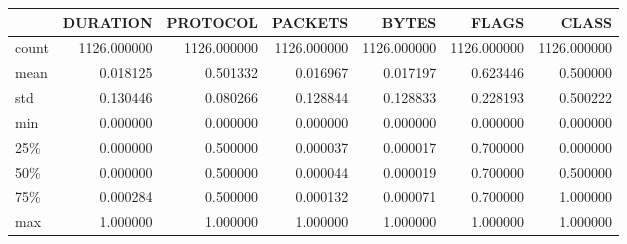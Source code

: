 \begin{tabular}{lrrrrrr}
\toprule
{} &     DURATION &     PROTOCOL &      PACKETS &        BYTES &        FLAGS &        CLASS \\
\midrule
count &  1126.000000 &  1126.000000 &  1126.000000 &  1126.000000 &  1126.000000 &  1126.000000 \\
mean  &     0.018125 &     0.501332 &     0.016967 &     0.017197 &     0.623446 &     0.500000 \\
std   &     0.130446 &     0.080266 &     0.128844 &     0.128833 &     0.228193 &     0.500222 \\
min   &     0.000000 &     0.000000 &     0.000000 &     0.000000 &     0.000000 &     0.000000 \\
25\%   &     0.000000 &     0.500000 &     0.000037 &     0.000017 &     0.700000 &     0.000000 \\
50\%   &     0.000000 &     0.500000 &     0.000044 &     0.000019 &     0.700000 &     0.500000 \\
75\%   &     0.000284 &     0.500000 &     0.000132 &     0.000071 &     0.700000 &     1.000000 \\
max   &     1.000000 &     1.000000 &     1.000000 &     1.000000 &     1.000000 &     1.000000 \\
\bottomrule
\end{tabular}
